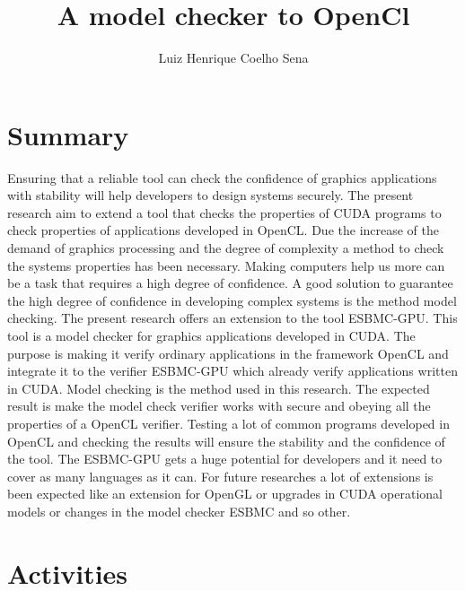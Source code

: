 \documentclass[11pt]{article}
\begin{document}
%
\author{Luiz Henrique Coelho Sena}
\title{A model checker to OpenCl}
\maketitle

\section{Summary}

Ensuring that a reliable tool can check the confidence of graphics applications with stability will help developers to design systems securely. The present research aim to extend a tool that checks the properties of CUDA programs to check properties of applications developed in OpenCL.\linebreak
Due the increase of the demand of graphics processing and the degree of complexity a method to check the systems properties has been necessary. Making computers help us more can be a task that requires a high degree of confidence. A good solution to guarantee the high degree of confidence in developing complex systems is the method model checking.\linebreak
The present research offers an extension to the tool ESBMC-GPU. This tool is a model checker for graphics applications developed in CUDA. The purpose is making it verify ordinary applications in the framework OpenCL and integrate it to the verifier ESBMC-GPU which already verify applications written in CUDA.\linebreak
Model checking is the method used in this research. The expected result is make the model check verifier works with secure and obeying all the properties of a OpenCL verifier. Testing a lot of common programs developed in OpenCL and checking the results will ensure the stability and the confidence of the tool.
The ESBMC-GPU gets a huge potential for developers and it need to cover as many languages as it can. For future researches a lot of extensions is been expected like an extension for OpenGL or upgrades in CUDA operational models or changes in the model checker ESBMC and so other.


\section{Activities}
\end{document}
